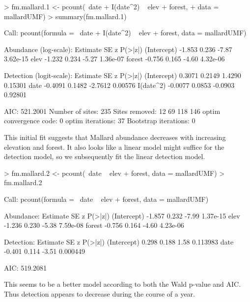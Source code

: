 \documentclass[article,shortnames]{jss}
\begin{document}
\begin{Schunk}
\begin{Sinput}
> fm.mallard.1 <- pcount(~date + I(date^2) ~ elev + forest, 
+     data = mallardUMF)
> summary(fm.mallard.1)
\end{Sinput}
\begin{Soutput}
Call:
pcount(formula = ~date + I(date^2) ~ elev + forest, data = mallardUMF)

Abundance (log-scale):
            Estimate    SE     z  P(>|z|)
(Intercept)   -1.853 0.236 -7.87 3.62e-15
elev          -1.232 0.234 -5.27 1.36e-07
forest        -0.756 0.165 -4.60 4.32e-06

Detection (logit-scale):
            Estimate     SE       z P(>|z|)
(Intercept)   0.3071 0.2149  1.4290 0.15301
date         -0.4091 0.1482 -2.7612 0.00576
I(date^2)    -0.0077 0.0853 -0.0903 0.92801

AIC: 521.2001 
Number of sites: 235
Sites removed: 12 69 118 146
optim convergence code: 0
optim iterations: 37 
Bootstrap iterations: 0 
\end{Soutput}
\end{Schunk}

This initial fit suggests that Mallard abundance decreases with
increasing elevation and forest.  It also looks like a linear model
might suffice for the detection model, so we subsequently fit the
linear detection model.


\begin{Schunk}
\begin{Sinput}
> fm.mallard.2 <- pcount(~date ~ elev + forest, data = mallardUMF)
> fm.mallard.2
\end{Sinput}
\begin{Soutput}
Call:
pcount(formula = ~date ~ elev + forest, data = mallardUMF)

Abundance:
            Estimate    SE     z  P(>|z|)
(Intercept)   -1.857 0.232 -7.99 1.37e-15
elev          -1.236 0.230 -5.38 7.59e-08
forest        -0.756 0.164 -4.60 4.23e-06

Detection:
            Estimate    SE     z  P(>|z|)
(Intercept)    0.298 0.188  1.58 0.113983
date          -0.401 0.114 -3.51 0.000449

AIC: 519.2081 
\end{Soutput}
\end{Schunk}

This seems to be a better model according to both the Wald p-value and
AIC.  Thus detection appears to decrease during the course of a year.
\end{document}
